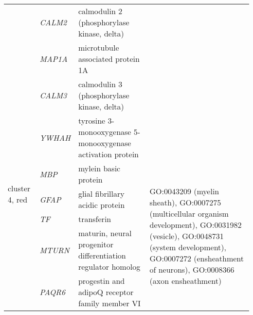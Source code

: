 \begin{table}[htp]
\begin{center}
\begin{tabular}{|p{0.7in}|p{0.7in}|p{2in}|p{3in}|}
			& \small{\textit{CALM2}} & \footnotesize{calmodulin 2 (phosphorylase kinase, delta)} & \\
			& \small{\textit{MAP1A}} & \footnotesize{microtubule associated protein 1A} &\\
			&  \small{\textit{CALM3}} & \footnotesize{calmodulin 3 (phosphorylase kinase, delta)} & \\
			& \small{\textit{YWHAH}} & \footnotesize{tyrosine 3-monooxygenase  5-monooxygenase activation protein} & \\
\hline
 \multirow{3}{4em}{\small{cluster 4, red}} & \small{\textit{MBP}} & \footnotesize{mylein basic protein} & \multirow{6}{16em}{\footnotesize{GO:0043209 (myelin sheath), GO:0007275 (multicellular organism development), GO:0031982 (vesicle), GO:0048731 (system development), GO:0007272 (ensheathment of neurons), GO:0008366 (axon ensheathment)}} \\
 			& \small{\textit{GFAP}} & \footnotesize{glial fibrillary acidic protein} & \\
			& \small{\textit{TF}} & \footnotesize{transferin} & \\
			& \small{\textit{MTURN}} & \footnotesize{maturin, neural progenitor differentiation regulator homolog } & \\
			& \small{\textit{PAQR6}} & \footnotesize{progestin and adipoQ receptor family member VI} & \\
\hline	
\end{tabular}
\end{center} \label{tab:tab2}
 \end{table}



